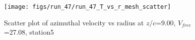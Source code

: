 \begin{figure}[H]
\centering
\texttt{[image: figs/run\_47/run\_47\_T\_vs\_r\_mesh\_scatter]}
\caption{Scatter plot of azimuthal velocity vs radius at $z/c$=9.00, $V_{free}$=27.08, station5}
\label{fig:run_47_T_vs_r_mesh_scatter}
\end{figure}


